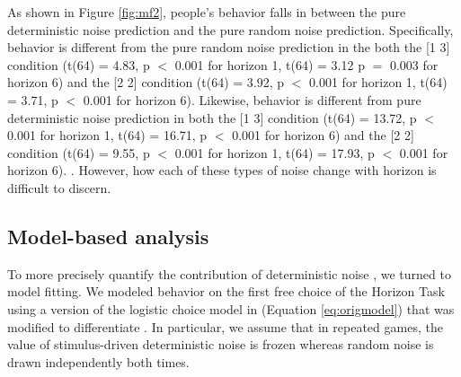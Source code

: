 \documentclass[12pt]{article}
\begin{document}
	As shown in Figure \ref{fig:mf2}, people's behavior falls in between the pure deterministic noise prediction and the pure random noise prediction. Specifically, behavior is different from the pure random noise prediction in the both the [1 3] condition (t(64) = 4.83, p $<$ 0.001 for horizon 1, t(64) = 3.12 p $=$ 0.003 for horizon 6) and the [2 2] condition (t(64) = 3.92, p $<$ 0.001 for horizon 1, t(64) = 3.71, p $<$ 0.001 for horizon 6). Likewise, behavior is different from pure deterministic noise prediction in both the [1 3] condition (t(64) = 13.72, p $<$ 0.001 for horizon 1, t(64) = 16.71, p $<$ 0.001 for horizon 6) and the [2 2] condition (t(64) = 9.55, p $<$ 0.001 for horizon 1, t(64) = 17.93, p $<$ 0.001 for horizon 6).  . However,  how each of these types of noise change with horizon is difficult to discern.
 
	\subsection*{Model-based analysis }
	
	To more precisely quantify the contribution of deterministic noise , we turned to model fitting. We modeled behavior on the first free choice of the Horizon Task using a version of the logistic choice model in \citep{wilson2014} (Equation \ref{eq:origmodel}) that was modified to differentiate . In particular, we assume that in repeated games, the value of stimulus-driven deterministic noise is frozen whereas random noise is drawn independently both times. 
	
\end{document}
